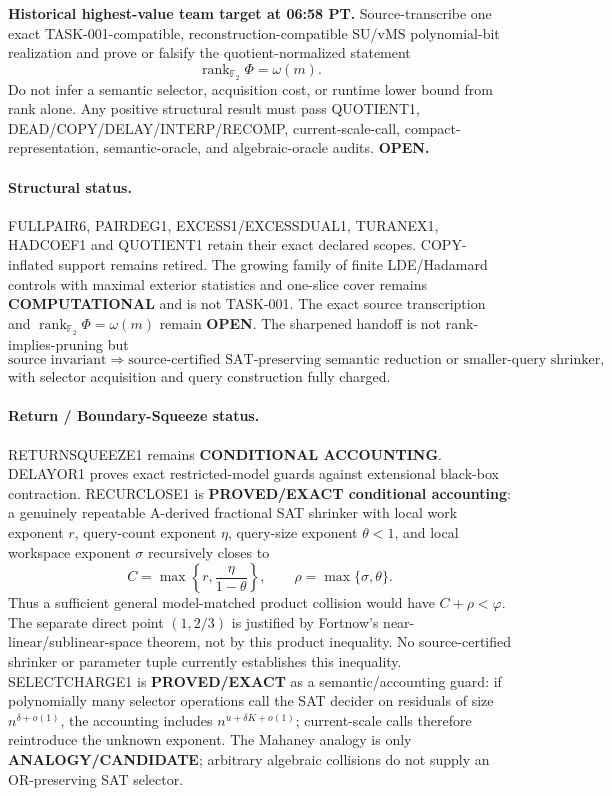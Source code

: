 \documentclass[11pt]{article}
\begin{document}
\begin{candidatebox}
\textbf{Historical highest-value team target at 06:58 PT.}
Source-transcribe one exact TASK-001-compatible, reconstruction-compatible SU/vMS
polynomial-bit realization and prove or falsify the quotient-normalized statement
\[
\operatorname{rank}_{\mathbb F_2}\Phi=\omega(m).
\]
Do not infer a semantic selector, acquisition cost, or runtime lower bound from rank alone.
Any positive structural result must pass QUOTIENT1, DEAD/COPY/DELAY/INTERP/RECOMP,
current-scale-call, compact-representation, semantic-oracle, and algebraic-oracle audits.
\textbf{OPEN.}
\end{candidatebox}

\paragraph{Structural status.}
FULLPAIR6, PAIRDEG1, EXCESS1/EXCESSDUAL1, TURANEX1, HADCOEF1 and QUOTIENT1 retain
their exact declared scopes. COPY-inflated support remains retired. The growing family of
finite LDE/Hadamard controls with maximal exterior statistics and one-slice cover remains
\textbf{COMPUTATIONAL} and is not TASK-001. The exact source transcription and
\(\operatorname{rank}_{\mathbb F_2}\Phi=\omega(m)\) remain \textbf{OPEN}.
The sharpened handoff is not rank-implies-pruning but
\[
\text{source invariant}
\Longrightarrow
\text{source-certified SAT-preserving semantic reduction or smaller-query shrinker},
\]
with selector acquisition and query construction fully charged.

\paragraph{Return / Boundary-Squeeze status.}
RETURNSQUEEZE1 remains \textbf{CONDITIONAL ACCOUNTING}. DELAYOR1 proves exact restricted-model
guards against extensional black-box contraction. RECURCLOSE1 is \textbf{PROVED/EXACT
conditional accounting}: a genuinely repeatable A-derived fractional SAT shrinker with
local work exponent \(r\), query-count exponent \(\eta\), query-size exponent \(\theta<1\),
and local workspace exponent \(\sigma\) recursively closes to
\[
C=\max\left\{r,\frac{\eta}{1-\theta}\right\},
\qquad
\rho=\max\{\sigma,\theta\}.
\]
Thus a sufficient general model-matched product collision would have
\(C+\rho<\varphi\).  The separate direct point $(1,2/3)$ is justified by
Fortnow's near-linear/sublinear-space theorem, not by this product inequality.
No source-certified shrinker or parameter tuple currently establishes this inequality.
SELECTCHARGE1 is \textbf{PROVED/EXACT} as a semantic/accounting guard: if polynomially
many selector operations call the SAT decider on residuals of size \(n^{\delta+o(1)}\),
the accounting includes \(n^{u+\delta K+o(1)}\); current-scale calls therefore reintroduce
the unknown exponent. The Mahaney analogy is only \textbf{ANALOGY/CANDIDATE}; arbitrary
algebraic collisions do not supply an OR-preserving SAT selector.
\end{document}
